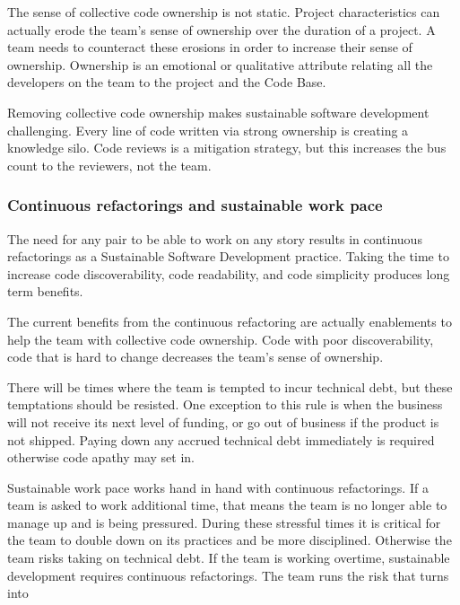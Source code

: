 The sense of collective code ownership is not static. Project characteristics can actually erode the team's sense of ownership over the duration of a project. A team needs to counteract these erosions in order to increase their sense of ownership. Ownership is an emotional or qualitative attribute relating all the developers on the team to the project and the Code Base.


Removing collective code ownership makes sustainable software development challenging. Every line of code written via strong ownership is creating a knowledge silo. Code reviews is a mitigation strategy, but this increases the bus count to the reviewers, not the team. 

\subsubsection{Continuous refactorings and sustainable work pace}
The need for any pair to be able to work on any story results in continuous refactorings as a Sustainable Software Development practice. Taking the time to increase code discoverability, code readability, and code simplicity produces long term benefits. 

The current benefits from the continuous refactoring are actually enablements to help the team with collective code ownership. Code with poor discoverability, code that is hard to change decreases the team's sense of ownership.

There will be times where the team is tempted to incur technical debt, but these temptations should be resisted. One exception to this rule is when the business will not receive its next level of funding, or go out of business if the product is not shipped. Paying down any accrued technical debt immediately is required otherwise code apathy may set in. 

Sustainable work pace works hand in hand with continuous refactorings. If a team is asked to work additional time, that means the team is no longer able to manage up and is being pressured. During these stressful times it is critical for the team to double down on its practices and be more disciplined. Otherwise the team risks taking on technical debt. If the team is working overtime, sustainable development requires continuous refactorings. The team runs the risk that  turns into 

